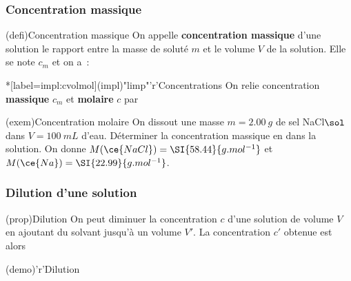 \documentclass[../../main/main.tex]{subfiles}
\begin{document}
\subsubsection{Concentration massique}

\begin{tcbraster}[raster columns=2, raster equal height=rows]
	\begin{tcb}[label=def:cmol](defi){Concentration massique}
		On appelle \textbf{concentration massique} d'une solution le
		rapport entre la masse de soluté $m$ et le volume $V$ de
		la solution. Elle se note $c_m$ et on a~:
		\csw{
			\[
				\boxed{c_m = \frac{m}{V}}
				\qen
				\si{g.L^{-1}}
			\]
		}
		\vspace{-15pt}
	\end{tcb}
	\begin{tcb}*[label=impl:cvolmol](impl)"limp"'r'{Concentrations}
		On relie concentration \textbf{massique} $c_m$ et \textbf{molaire} $c$ par
		\csw{
			\[ \boxed{c_m = cM}\]
		}
		\vspace{-15pt}
	\end{tcb}
\end{tcbraster}

\begin{tcb}[label=exem:cmol](exem){Concentration molaire}
	On dissout une masse $m = \SI{2.00}{g}$ de sel NaCl$\sol$ dans
	$V = \SI{100}{mL}$ d'eau.
	\smallbreak
	Déterminer la concentration massique en  dans la solution.
	\smallbreak
	On donne
	$M(\ce{NaCl}) = \SI{58.44}{g.mol^{-1}}$ et
	$M(\ce{Na}) = \SI{22.99}{g.mol^{-1}}$.
	\tcblower
\end{tcb}

\vspace{-20pt}
\subsubsection{Dilution d'une solution}

\begin{tcbraster}[raster columns=2, raster equal height=rows]
	\begin{tcb}[label=prop:dilu](prop){Dilution}
		On peut diminuer la concentration $c$ d'une solution de volume $V$ en
		ajoutant du solvant jusqu'à un volume $V'$. La concentration $c'$
		obtenue est alors
		\csw{
			\[
				\boxed{cV = c'V'}
				\Lra
				\boxed{\frac{c}{c'} = \frac{V'}{V}}
			\]
		}
	\end{tcb}
	\begin{tcb}[label=demo:dilu](demo)'r'{Dilution}
	\end{tcb}
\end{tcbraster}
\end{document}
